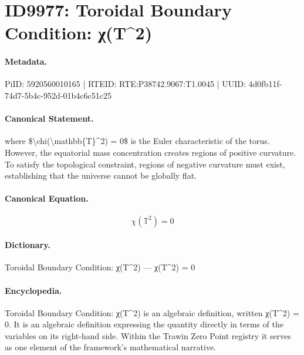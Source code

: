 \section*{ID9977: Toroidal Boundary Condition: χ(T\textasciicircum{}2)}
\paragraph{Metadata.}
PiID: 5920560010165 | RTEID: RTE:P38742.9067:T1.0045 | UUID: 4d0fb11f-74d7-5b4c-952d-01b4c6c51c25

\paragraph{Canonical Statement.}
where \$\textbackslash{}chi(\textbackslash{}mathbb\{T\}\textasciicircum{}2) = 0\$ is the Euler characteristic of the torus. However, the equatorial mass concentration creates regions of positive curvature. To satisfy the topological constraint, regions of negative curvature must exist, establishing that the universe cannot be globally flat.

\paragraph{Canonical Equation.}
\[
\chi(\mathbb{T}^2) = 0
\]

\paragraph{Dictionary.}
Toroidal Boundary Condition: χ(T\textasciicircum{}2) — χ(T\textasciicircum{}2) = 0

\paragraph{Encyclopedia.}
Toroidal Boundary Condition: χ(T\textasciicircum{}2) is an algebraic definition, written χ(T\textasciicircum{}2) = 0. It is an algebraic definition expressing the quantity directly in terms of the variables on its right-hand side. Within the Trawin Zero Point registry it serves as one element of the framework's mathematical narrative.
